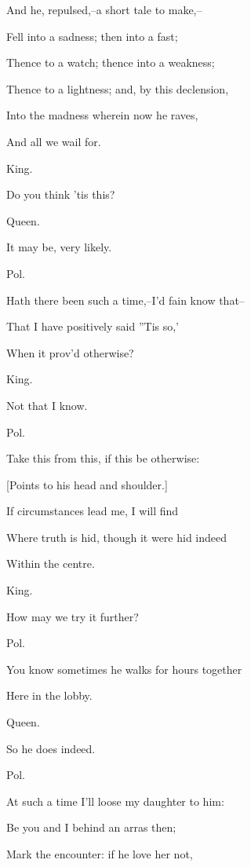 \documentclass[12pt]{book}
\begin{document}
And he, repulsed,--a short tale to make,--

Fell into a sadness; then into a fast;

Thence to a watch; thence into a weakness;

Thence to a lightness; and, by this declension,

Into the madness wherein now he raves,

And all we wail for.



King.

Do you think 'tis this?



Queen.

It may be, very likely.



Pol.

Hath there been such a time,--I'd fain know that--

That I have positively said ''Tis so,'

When it prov'd otherwise?



King.

Not that I know.



Pol.

Take this from this, if this be otherwise:

[Points to his head and shoulder.]

If circumstances lead me, I will find

Where truth is hid, though it were hid indeed

Within the centre.



King.

How may we try it further?



Pol.

You know sometimes he walks for hours together

Here in the lobby.



Queen.

So he does indeed.



Pol.

At such a time I'll loose my daughter to him:

Be you and I behind an arras then;

Mark the encounter: if he love her not,
\end{document}
